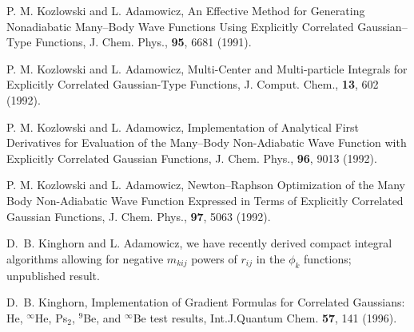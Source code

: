 \begin{thebibliography}{999}
P. M. Kozlowski and L. Adamowicz, 
An Effective Method for Generating Nonadiabatic
Many--Body Wave Functions Using Explicitly Correlated
Gaussian--Type Functions,
J. Chem. Phys., {\bf 95}, 6681 (1991).

P. M. Kozlowski and L. Adamowicz, 
Multi-Center and Multi-particle Integrals for
Explicitly Correlated Gaussian-Type Functions,
J. Comput. Chem., {\bf 13}, 602 (1992).


P. M. Kozlowski and L. Adamowicz, 
Implementation of Analytical First Derivatives for
Evaluation of the Many--Body Non-Adiabatic Wave Function
with Explicitly Correlated Gaussian Functions,
J. Chem. Phys., {\bf 96}, 9013 (1992).

P. M. Kozlowski and L. Adamowicz, 
Newton--Raphson Optimization of the Many Body
Non-Adiabatic Wave Function Expressed in Terms of Explicitly
Correlated Gaussian Functions,
J. Chem. Phys., {\bf 97}, 5063 (1992).


%
%
%
%
%
%
%
%
%
%
%
%
%
%
%

D.~B. Kinghorn and L. Adamowicz, we have recently derived
compact integral algorithms allowing for negative $m_{kij}$ powers
of $r_{ij}$ in the $\phi_k$ functions; unpublished result.


D.~B. Kinghorn,
Implementation of Gradient Formulas for Correlated
Gaussians: He, $^{\infty}$He, Ps$_2$, $^9$Be, and $^{\infty}$Be
test results,
\newblock Int.J.Quantum Chem. {\bf 57}, 141 (1996).


\end{thebibliography}

